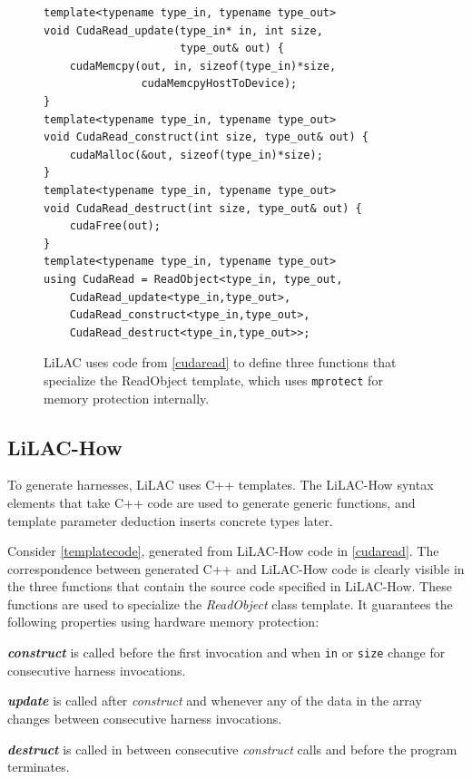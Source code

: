 \begin{figure}[p]
\begin{lstlisting}
template<typename type_in, typename type_out>
void CudaRead_update(type_in* in, int size,
                     type_out& out) {
    cudaMemcpy(out, in, sizeof(type_in)*size,
               cudaMemcpyHostToDevice);
}
template<typename type_in, typename type_out>
void CudaRead_construct(int size, type_out& out) {
    cudaMalloc(&out, sizeof(type_in)*size);
}
template<typename type_in, typename type_out>
void CudaRead_destruct(int size, type_out& out) {
    cudaFree(out);
}
template<typename type_in, typename type_out>
using CudaRead = ReadObject<type_in, type_out,
    CudaRead_update<type_in,type_out>,
    CudaRead_construct<type_in,type_out>,
    CudaRead_destruct<type_in,type_out>>;
\end{lstlisting}
\vspace{-0.5em}
\caption{LiLAC uses code from \autoref{cudaread} to define three functions that
         specialize the ReadObject template, which uses \texttt{mprotect} for
         memory protection internally.}
\label{templatecode}
\end{figure}

\subsection{LiLAC-How}
To generate harnesses, LiLAC uses C++ templates.
The LiLAC-How syntax elements that take C++ code are used to generate
generic functions, and template parameter deduction inserts concrete types later.

Consider \autoref{templatecode}, generated from LiLAC-How code in
\autoref{cudaread}.
The correspondence between generated C++ and LiLAC-How code is clearly visible
in the three functions that contain the source code specified in LiLAC-How.
These functions are used to specialize the {\em ReadObject} class template.
It guarantees the following properties using hardware memory protection:

    \noindent
    {\bf {\em construct}} is called before the first invocation and when
    \texttt{in} or \texttt{size} change for consecutive harness invocations.

    \noindent
    {\bf {\em update}} is called after {\em construct} and whenever any of the
    data in the array changes between consecutive harness invocations.

    \noindent
    {\bf {\em destruct}} is called in between consecutive {\em construct}
    calls and before the program terminates.

